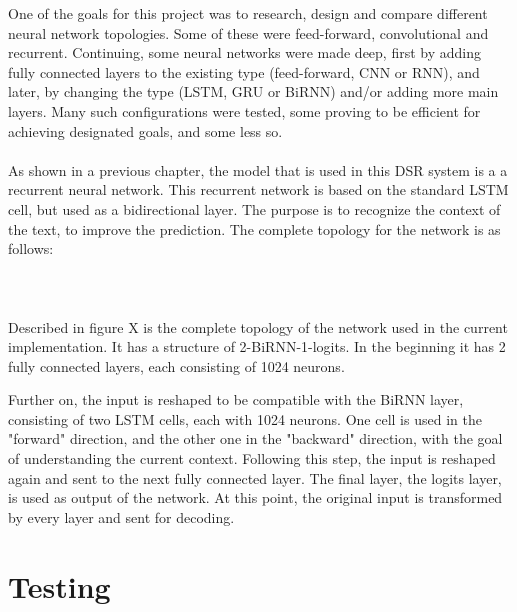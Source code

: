 One of the goals for this project was to research, design and compare different neural network topologies. 
Some of these were feed-forward, convolutional and recurrent. 
Continuing, some neural networks were made deep, first by adding fully connected layers to the existing type (feed-forward, CNN or RNN), and later, by changing the type (LSTM, GRU or BiRNN) and/or adding more main layers. 
Many such configurations were tested, some proving to be efficient for achieving designated goals, and some less so. \\\\
As shown in a previous chapter, the model that is used in this DSR system is a a recurrent neural network. 
This recurrent network is based on the standard LSTM cell, but used as a bidirectional layer. 
The purpose is to recognize the context of the text, to improve the prediction. 
The complete topology for the network is as follows: \\\\
 \\\\
Described in figure X is the complete topology of the network used in the current implementation. It has a structure of 2-BiRNN-1-logits. In the beginning it has 2 fully connected layers, each consisting of 1024 neurons.
 
Further on, the input is reshaped to be compatible with the BiRNN layer, consisting of two LSTM cells, each with 1024 neurons.
One cell is used in the "forward" direction, and the other one in the "backward" direction, with the goal of understanding the current context.
Following this step, the input is reshaped again and sent to the next fully connected layer.
The final layer, the logits layer, is used as output of the network. At this point, the original input is transformed by every layer and sent for decoding.



\section{Testing}










